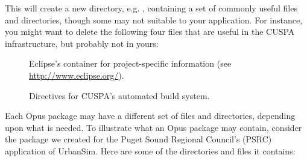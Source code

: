 This will create a new directory, e.g. ,
containing a set of commonly useful files and directories, though some may not
suitable to your application. For instance, you might want to delete the
following four files that are useful in the CUSPA \cuspaindex infrastructure,
but probably not in yours:

\begin{description}

\item[]  Eclipse's \eclipseindex
container for project-specific information (see \url{http://www.eclipse.org/}).

\item[]
Directives for CUSPA's \cuspaindex automated build system.

\end{description}

Each Opus package may have a different set of files and directories, depending
upon what is needed. To illustrate what an Opus package may contain, consider
the  package we created for the Puget Sound Regional
Council's (PSRC) \psrcindex application
of UrbanSim.  Here are some of the directories and files it contains:

